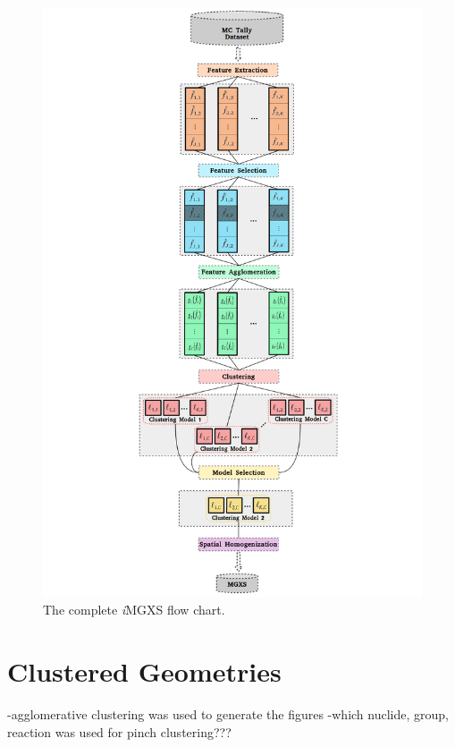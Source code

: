\begin{figure}[h!]
\centering
\includegraphics[width=0.95\linewidth]{figures/unsupervised/features/engineering/flow-chart}
\vspace{2mm}
\caption[\textit{i}MGXS flow chart]{The complete \textit{i}\ac{MGXS} flow chart.}
\label{fig:chap10-flow-chart}
\end{figure}


\section{Clustered Geometries}
\label{sec:chap10-geometries}

-agglomerative clustering was used to generate the figures
-which nuclide, group, reaction was used for pinch clustering???

